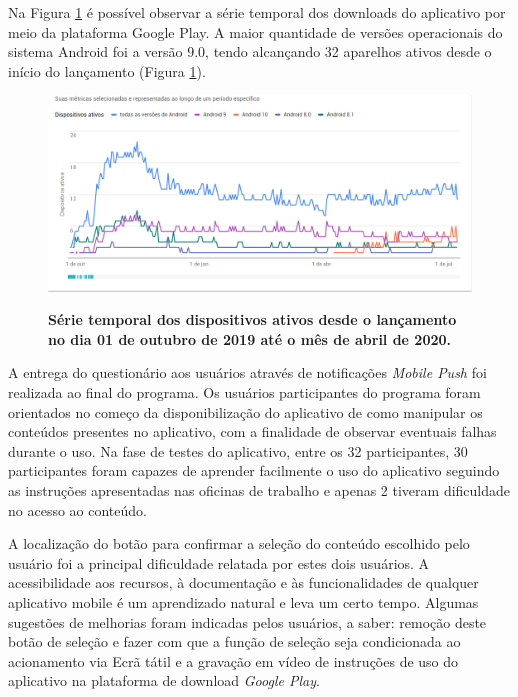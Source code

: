 Na Figura \ref{figura_43} é possível observar a série temporal dos downloads do aplicativo por meio da plataforma Google Play. A maior quantidade de versões operacionais do sistema Android foi a versão 9.0, tendo alcançando 32 aparelhos ativos desde o início do lançamento (Figura \ref{figura_43}).


\begin{figure}[H]
\caption{\textbf{Série temporal dos dispositivos ativos desde o lançamento no dia 01 de outubro de 2019 até o mês de abril de 2020.}}
\centering
\includegraphics[scale=0.6]{Imagens/dispositivos_instalados.png}
\label{figura_43}
\end{figure}

A entrega do questionário aos usuários através de notificações \textit{Mobile Push} foi realizada ao final do programa. Os usuários participantes do programa foram orientados no começo da disponibilização do aplicativo de como manipular os conteúdos presentes no aplicativo, com a finalidade de observar eventuais falhas durante o uso.
Na fase de testes do aplicativo, entre os 32 participantes, 30 participantes foram capazes de aprender facilmente o uso do aplicativo seguindo as instruções apresentadas nas oficinas de trabalho e apenas 2 tiveram dificuldade no acesso ao conteúdo.

A localização do botão para confirmar a seleção do conteúdo escolhido pelo usuário foi a principal dificuldade relatada por estes dois usuários. A acessibilidade aos recursos, à documentação e às funcionalidades de qualquer aplicativo mobile é um aprendizado natural e leva um certo tempo. Algumas sugestões de melhorias foram indicadas pelos usuários, a saber: remoção deste botão de seleção e fazer com que a função de seleção seja condicionada ao acionamento via Ecrã tátil e a gravação em vídeo de instruções de uso do aplicativo na plataforma de download \textit{Google Play}.

